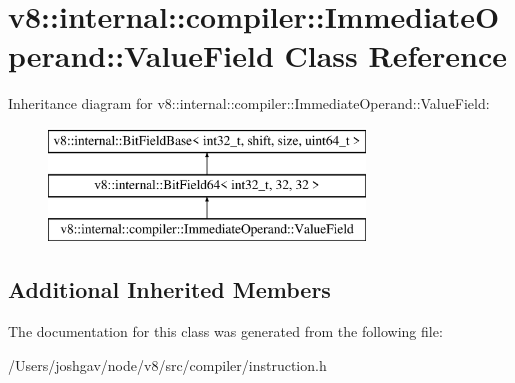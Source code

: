 \hypertarget{classv8_1_1internal_1_1compiler_1_1_immediate_operand_1_1_value_field}{}\section{v8\+:\+:internal\+:\+:compiler\+:\+:Immediate\+Operand\+:\+:Value\+Field Class Reference}
\label{classv8_1_1internal_1_1compiler_1_1_immediate_operand_1_1_value_field}
Inheritance diagram for v8\+:\+:internal\+:\+:compiler\+:\+:Immediate\+Operand\+:\+:Value\+Field\+:\begin{figure}[H]
\begin{center}
\leavevmode
\includegraphics[height=3.000000cm]{classv8_1_1internal_1_1compiler_1_1_immediate_operand_1_1_value_field}
\end{center}
\end{figure}
\subsection*{Additional Inherited Members}


The documentation for this class was generated from the following file\+:\begin{DoxyCompactItemize}
\item 
/\+Users/joshgav/node/v8/src/compiler/instruction.\+h\end{DoxyCompactItemize}
